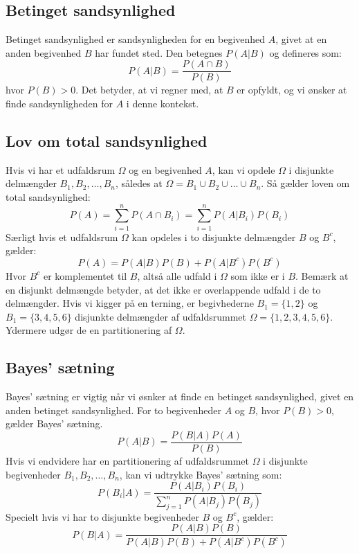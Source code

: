 \documentclass{article}
\begin{document}
\subsection*{Betinget sandsynlighed}
Betinget sandsynlighed er sandsynligheden for en begivenhed $A$, givet at en anden begivenhed $B$ har fundet sted. Den betegnes $P(A|B)$ og defineres som:
\begin{equation}
P(A|B) = \frac{P(A \cap B)}{P(B)}
\end{equation}
hvor $P(B) > 0$. Det betyder, at vi regner med, at $B$ er opfyldt, og vi ønsker at finde sandsynligheden for $A$ i denne kontekst.

\subsection*{Lov om total sandsynlighed}
Hvis vi har et udfaldsrum $\Omega$ og en begivenhed $A$, kan vi opdele $\Omega$ i disjunkte delmængder $B_1, B_2, \ldots, B_n$, således at $\Omega = B_1 \cup B_2 \cup \ldots \cup B_n$. Så gælder loven om total sandsynlighed:
\begin{equation}
P(A) = \sum_{i=1}^{n} P(A \cap B_i) = \sum_{i=1}^{n} P(A|B_i)P(B_i)
\end{equation}
Særligt hvis et udfaldsrum $\Omega$ kan opdeles i to disjunkte delmængder $B$ og $B^c$, gælder:
\begin{equation}
P(A) = P(A|B)P(B) + P(A|B^c)P(B^c)
\end{equation}
Hvor $B^c$ er komplementet til $B$, altså alle udfald i $\Omega$ som ikke er i $B$. Bemærk at en disjunkt delmængde betyder, at det ikke er overlappende udfald i de to delmængder. Hvis vi kigger på en terning, er begivhederne $B_1 = \{1,2\}$ og $B_1 = \{3,4,5,6\}$ disjunkte delmængder af udfaldsrummet $\Omega = \{1,2,3,4,5,6\}$. Ydermere udgør de en partitionering af $\Omega$. \vspace{1em}



\subsection*{Bayes' sætning}
Bayes' sætning er vigtig når vi øsnker at finde en betinget sandsynlighed, givet en anden betinget sandsynlighed.
For to begivenheder $A$ og $B$, hvor $P(B) > 0$, gælder Bayes' sætning.
\begin{equation}
P(A|B) = \frac{P(B|A)P(A)}{P(B)}
\end{equation}
Hvis vi endvidere har en partitionering af udfaldsrummet $\Omega$ i disjunkte begivenheder $B_1, B_2, \ldots, B_n$, kan vi udtrykke Bayes' sætning som:
\begin{equation}
P(B_i|A) = \frac{P(A|B_i)P(B_i)}{\sum_{j=1}^{n} P(A|B_j)P(B_j)}
\end{equation}
Specielt hvis vi har to disjunkte begivenheder $B$ og $B^c$, gælder:
\begin{equation}
P(B|A) = \frac{P(A|B)P(B)}{P(A|B)P(B) + P(A|B^c)P(B^c)}
\end{equation}
\end{document}
